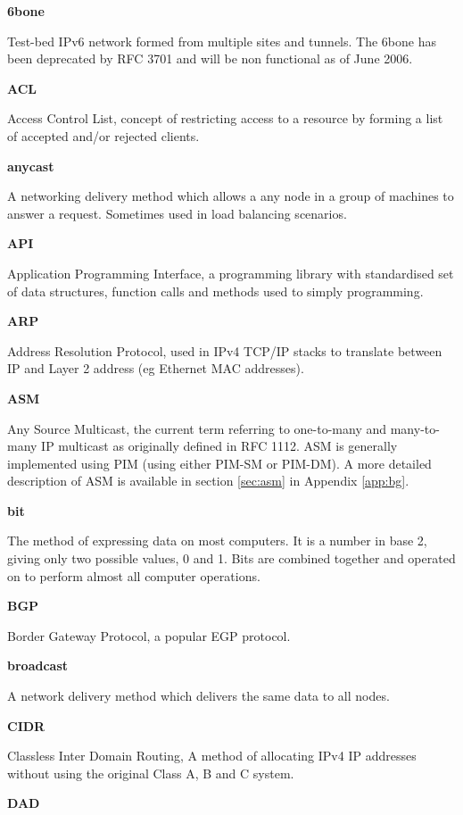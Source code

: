 \textbf{6bone}

Test-bed IPv6 network formed from multiple sites and tunnels. The 6bone
has been deprecated by RFC 3701 and will be non functional as of June
2006.

\textbf{ACL}

Access Control List, concept of restricting access to a resource by
forming a list of accepted and/or rejected clients.

\textbf{anycast}

A networking delivery method which allows a any node in a group of 
machines to answer a request. Sometimes used in load balancing 
scenarios.

\textbf{API}

Application Programming Interface, a programming library with
standardised set of data structures, function calls and methods used to
simply programming.

\textbf{ARP}

Address Resolution Protocol, used in IPv4 TCP/IP stacks to translate 
between IP and Layer 2 address (eg Ethernet MAC addresses).

\textbf{ASM}

Any Source Multicast, the current term referring to one-to-many and
many-to-many IP multicast as originally defined in RFC 1112. ASM is 
generally implemented using PIM (using either PIM-SM or PIM-DM). A more 
detailed description of ASM is available in section \ref{sec:asm} in 
Appendix \ref{app:bg}.

\textbf{bit}

The method of expressing data on most computers. It is a number in base
2, giving only two possible values, 0 and 1. Bits are combined together
and operated on to perform almost all computer operations.

\textbf{BGP}

Border Gateway Protocol, a popular EGP protocol.  

\textbf{broadcast}

A network delivery method which delivers the same data to all nodes.

\textbf{CIDR}

Classless Inter Domain Routing, A method of allocating IPv4 IP addresses
without using the original Class A, B and C system.

\textbf{DAD}

